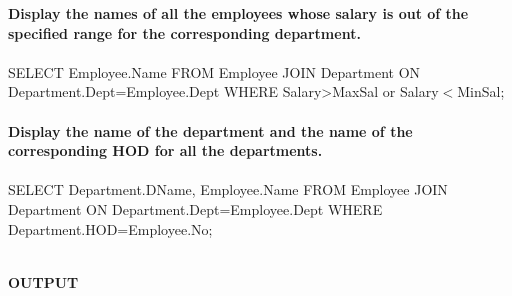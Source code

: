 \documentclass[
a4paper]{article}
\begin{document}
\begin{large}
		\textbf{Display the names of all the employees whose salary is out of the specified range for the corresponding department.}\\
		\\
		SELECT Employee.Name FROM Employee JOIN Department ON Department.Dept=Employee.Dept WHERE Salary>MaxSal or Salary$<$MinSal;\\
		\\
		\textbf{Display the name of the department and the name of the corresponding HOD for all the departments.}\\
		\\
		SELECT Department.DName, Employee.Name FROM Employee JOIN Department ON Department.Dept=Employee.Dept WHERE Department.HOD=Employee.No;\\
		\\
	\end{large}
	\begin{center}
		\Large\bfseries OUTPUT
	\end{center}
\end{document}
